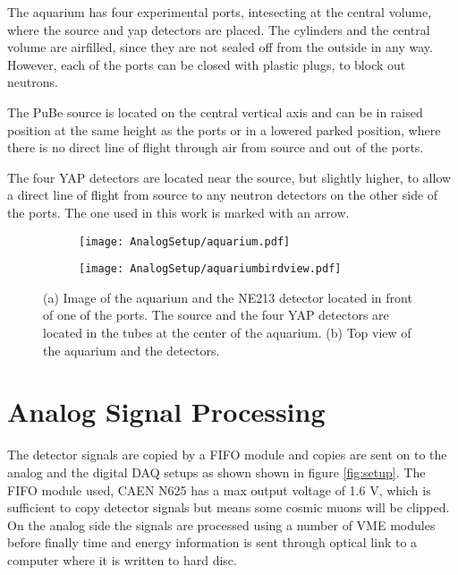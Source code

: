 \documentclass[main.tex]{subfiles}
\begin{document}
The aquarium has four experimental ports, intesecting at the central volume, where the source and yap detectors are placed. The cylinders and the central volume are airfilled, since they are not sealed off from the outside in any way. However, each of the ports can be closed with plastic plugs, to block out neutrons.

The PuBe source is located on the central vertical axis and can be in raised position at the same height as the ports or in a lowered parked position, where there is no direct line of flight through air from source and out of the ports.

The four YAP detectors are located near the source, but slightly higher, to allow a direct line of flight from source to any neutron detectors on the other side of the ports. The one used in this work is marked with an arrow.
\begin{figure}[ht]
	\center
	\begin{subfigure}[b]{0.49\textwidth}
	    \centering
    	    \texttt{[image: AnalogSetup/aquarium.pdf]}
        	\caption[Aquarium 3D]{}
	    \label{fig:aquarium_pers} 
	\end{subfigure}
	\begin{subfigure}[b]{0.49\textwidth}
	    \centering
    	    \texttt{[image: AnalogSetup/aquariumbirdview.pdf]}
        	\caption[Aquarium 2D, top view]{}
	    \label{fig:aquarium_bird} 
	\end{subfigure}
	\caption[CAD drawing of the aqurium]{(a) Image of the aquarium and the NE213 detector located in front of one of the ports. The source and the four YAP detectors are located in the tubes at the center of the aquarium. (b) Top view of the aquarium and the detectors.}
	\label{fig:aquarium}
\end{figure}

\section{Analog Signal Processing}
The detector signals are copied by a FIFO module and copies are sent on to the analog and the digital DAQ setups as shown shown in figure \ref{fig:setup}. The FIFO module used, CAEN N625 has a max output voltage of 1.6 V, which is sufficient to copy detector signals but means some cosmic muons will be clipped.  On the analog side the signals are processed using a number of VME modules before finally time and energy information is sent through optical link to a computer where it is written to hard disc. 
\end{document}
